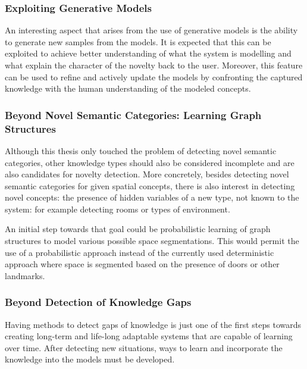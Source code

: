 \subsubsection*{Exploiting Generative Models}
An interesting aspect that arises from the use of generative models is the ability to generate new
samples from the models. It is expected that this can be exploited to achieve better understanding
of what the system is modelling and what explain the character of the novelty back to the user.
Moreover, this feature can be used to refine and actively update the models by confronting the captured 
knowledge with the human understanding of the modeled concepts.

\subsubsection*{Beyond Novel Semantic Categories: Learning Graph Structures}
Although this thesis only touched the problem of detecting novel semantic categories, other knowledge
types should also be considered incomplete and are also candidates for novelty detection.
More concretely, besides detecting novel semantic categories for given spatial concepts, there is
also interest in detecting novel concepts: the presence of hidden variables of a new type, not known
to the system: for example detecting rooms or types of environment.

An initial step towards that goal could be probabilistic learning of graph structures to model various
possible space segmentations. This would permit the use of a probabilistic approach instead of the currently used
deterministic approach where space is segmented based on the presence of doors or other landmarks.

\subsubsection*{Beyond Detection of Knowledge Gaps}
Having methods to detect gaps of knowledge is just one of the first steps towards creating long-term and
life-long adaptable systems that are capable of learning over time. After detecting new
situations, ways to learn and incorporate the knowledge into the models must be developed.

